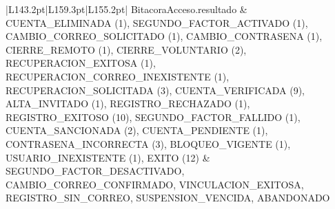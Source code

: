 \begin{center}
\begin{longtable}{|L{143.2pt}|L{159.3pt}|L{155.2pt}|}
BitacoraAcceso.resultado & CUENTA\_\allowbreak{}ELIMINADA (1), SEGUNDO\_\allowbreak{}FACTOR\_\allowbreak{}ACTIVADO (1), CAMBIO\_\allowbreak{}CORREO\_\allowbreak{}SOLICITADO (1), CAMBIO\_\allowbreak{}CONTRASENA (1), CIERRE\_\allowbreak{}REMOTO (1), CIERRE\_\allowbreak{}VOLUNTARIO (2), RECUPERACION\_\allowbreak{}EXITOSA (1), RECUPERACION\_\allowbreak{}CORREO\_\allowbreak{}INEXISTENTE (1), RECUPERACION\_\allowbreak{}SOLICITADA (3), CUENTA\_\allowbreak{}VERIFICADA (9), ALTA\_\allowbreak{}INVITADO (1), REGISTRO\_\allowbreak{}RECHAZADO (1), REGISTRO\_\allowbreak{}EXITOSO (10), SEGUNDO\_\allowbreak{}FACTOR\_\allowbreak{}FALLIDO (1), CUENTA\_\allowbreak{}SANCIONADA (2), CUENTA\_\allowbreak{}PENDIENTE (1), CONTRASENA\_\allowbreak{}INCORRECTA (3), BLOQUEO\_\allowbreak{}VIGENTE (1), USUARIO\_\allowbreak{}INEXISTENTE (1), EXITO (12) & SEGUNDO\_\allowbreak{}FACTOR\_\allowbreak{}DESACTIVADO, CAMBIO\_\allowbreak{}CORREO\_\allowbreak{}CONFIRMADO, VINCULACION\_\allowbreak{}EXITOSA, REGISTRO\_\allowbreak{}SIN\_\allowbreak{}CORREO, SUSPENSION\_\allowbreak{}VENCIDA, ABANDONADO \\ \hline
\end{longtable}
\end{center}
